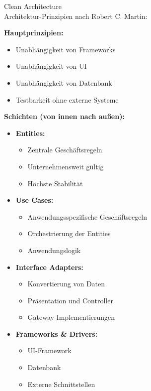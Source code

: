 \begin{concept}{Clean Architecture}\\
Architektur-Prinzipien nach Robert C. Martin:

\textbf{Hauptprinzipien:}
\begin{itemize}
    \item Unabhängigkeit von Frameworks
    \item Unabhängigkeit von UI
    \item Unabhängigkeit von Datenbank
    \item Testbarkeit ohne externe Systeme
\end{itemize}

\textbf{Schichten (von innen nach außen):}
\begin{itemize}
    \item \textbf{Entities:} 
    \begin{itemize}
        \item Zentrale Geschäftsregeln
        \item Unternehmensweit gültig
        \item Höchste Stabilität
    \end{itemize}
    
    \item \textbf{Use Cases:}
    \begin{itemize}
        \item Anwendungsspezifische Geschäftsregeln
        \item Orchestrierung der Entities
        \item Anwendungslogik
    \end{itemize}
    
    \item \textbf{Interface Adapters:}
    \begin{itemize}
        \item Konvertierung von Daten
        \item Präsentation und Controller
        \item Gateway-Implementierungen
    \end{itemize}
    
    \item \textbf{Frameworks \& Drivers:}
    \begin{itemize}
        \item UI-Framework
        \item Datenbank
        \item Externe Schnittstellen
    \end{itemize}
\end{itemize}


\end{concept}

